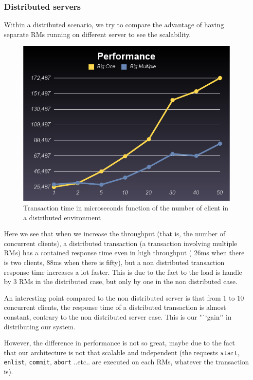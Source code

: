 \documentclass[a4paper]{article}
\begin{document}
\subsubsection{Distributed servers}

Within a distributed scenario, we try to compare the advantage of having separate RMs running on different server to see the scalability.

\begin{figure}[h!]
  \centering
	\includegraphics[scale=0.6]{distributed.png}
  \caption{Transaction time in microseconds function of the number of client in a distributed environment}
  \label{oneclient}
\end{figure}

Here we see that when we increase the throughput (that is, the number of concurrent clients), a distributed transaction (a transaction involving multiple RMs) has a contained response time even in high throughput ( 26ms when there is two clients, 88ms when there is fifty), but a non distributed transaction response time increases a lot faster. This is due to the fact to the load is handle by 3 RMs in the distributed case, but only by one in the non distributed case.

An interesting point compared to the non distributed server is that from 1 to 10 concurrent clients, the response time of a distributed transaction is almost constant, contrary to the non distributed server case. This is our "``gain'' in distributing our system.

However, the difference in performance is not so great, maybe due to the fact that our architecture is not that scalable and independent (the requests \texttt{start}, \texttt{enlist}, \texttt{commit}, \texttt{abort} ..etc.. are executed on each RMs, whatever the transaction is).

%
%
\end{document}
